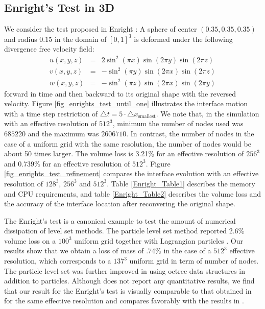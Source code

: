 \documentclass[english]{article}
\begin{document}
\subsection{Enright's Test in 3D \label{ex_enright_test}}
We consider the test proposed in Enright \etal \cite{Enright:2002:PLS}: A
sphere of center $(0.35,0.35,0.35)$ and radius $0.15$ in the domain of
$[0,1]^3$ is deformed under the following divergence free velocity field:
$$
\begin{array}{lcr}
u(x,y,z) &=& 2\sin^2(\pi x)\sin(2\pi y)\sin(2\pi z) \\
v(x,y,z) &=& -\sin^2(\pi y)\sin(2\pi x)\sin(2\pi z) \\
w(x,y,z) &=& -\sin^2(\pi z)\sin(2\pi x)\sin(2\pi y)
\end{array}
$$
forward in time and then backward to its original shape with the reversed velocity. Figure
\ref{fig_enrights_test_until_one} illustrates the interface motion with a time step restriction of
$\triangle t=5\cdot\triangle x_{\text{smallest}}$. We note that, in the simulation with an
effective resolution of $512^3$, minimum the number of nodes used was $685220$ and the maximum was
$2606710$. In contrast, the number of nodes in the case of a uniform grid with the same resolution,
the number of nodes would be about 50 times larger. The volume loss is 3.21\% for an effective
resolution of $256^3$ and 0.739\% for an effective resolution of $512^3$. Figure
\ref{fig_enrights_test_refinement} compares the interface evolution with an effective resolution of $128^3$, $256^3$ and $512^3$. Table \ref{Enright_Table1} describes the memory and CPU requirements, and table \ref{Enright_Table2} describes the volume loss and the accuracy of the interface location after reconvering the original shape.

The Enright's test is a canonical example to test the amount of numerical dissipation of level set
methods. The particle level set method reported 2.6\% volume loss on a $100^3$ uniform grid
together with Lagrangian particles \cite{Enright:2002:PLS}. Our results show that we obtain a loss
of mass of $.74\%$ in the case of a $512^3$ effective resolution, which corresponds to a $137^3$
uniform grid in term of number of nodes. The particle level set was further improved in
\cite{Enright:2002:AAR} using octree data structures in addition to particles. Although
\cite{Enright:2002:AAR} does not report any quantitative results, we find that our result for the
Enright's test is visually comparable to that obtained in \cite{Enright:2002:AAR} for the same
effective resolution and compares favorably with the results in \cite{Hieber:Particle_Level_Set}.
\end{document}
